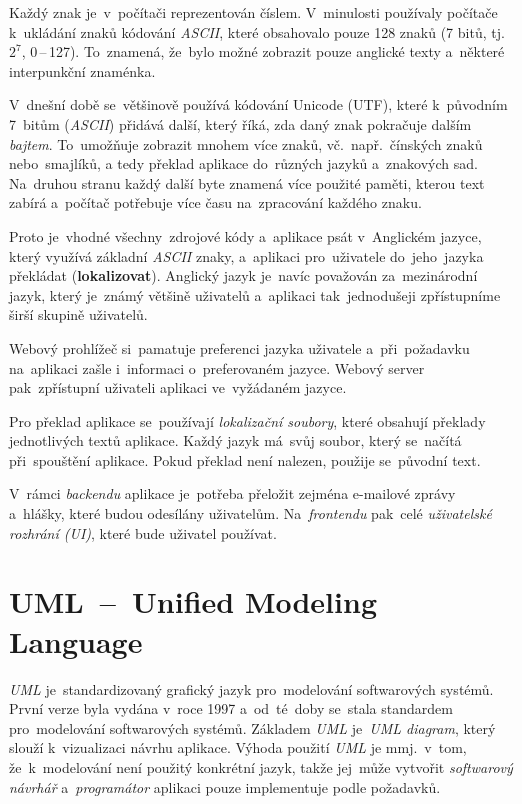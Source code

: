 \documentclass[11pt,a4paper]{report}
\begin{document}
            Každý znak je~v~počítači reprezentován číslem. V~minulosti používaly počítače k~ukládání znaků kódování \emph{ASCII}, které obsahovalo pouze 128 znaků (7 bitů, tj.~$2^7$, 0\,--\,127). To~znamená, že~bylo možné zobrazit pouze anglické texty a~některé interpunkční znaménka. 
            
            V~dnešní době se~většinově používá kódování Unicode (UTF), které k~původním 7~bitům (\emph{ASCII}) přidává další, který říká, zda daný znak pokračuje dalším \emph{bajtem}. To~umožňuje zobrazit mnohem více znaků, vč.~např.~čínských znaků nebo~smajlíků, a tedy překlad aplikace do~různých jazyků a~znakových sad. Na~druhou stranu každý další byte znamená více použité paměti, kterou text zabírá a~počítač potřebuje více času na~zpracování každého znaku.
            
            Proto je~vhodné všechny~zdrojové kódy a~aplikace psát v~Anglickém jazyce, který využívá základní \emph{ASCII} znaky, a~aplikaci pro~uživatele do~jeho~jazyka překládat (\textbf{lokalizovat}). Anglický jazyk je~navíc považován za~mezinárodní jazyk, který je~známý většině uživatelů a~aplikaci tak~jednodušeji zpřístupníme širší skupině uživatelů.
            
            Webový prohlížeč si~pamatuje preferenci jazyka uživatele a~při~požadavku na~aplikaci zašle i~informaci o~preferovaném jazyce. Webový server pak~zpřístupní uživateli aplikaci ve~vyžádaném jazyce.

            Pro překlad aplikace se~používají \emph{lokalizační soubory}, které obsahují překlady jednotlivých textů aplikace. Každý jazyk má~svůj soubor, který se~načítá při~spouštění aplikace. Pokud překlad není nalezen, použije se~původní text.

            V~rámci \emph{backendu} aplikace je~potřeba přeložit zejména e-mailové zprávy a~hlášky, které budou odesílány uživatelům. Na~\emph{frontendu} pak~celé \emph{uživatelské rozhrání (UI)}, které bude uživatel používat.

        \section{UML~--~Unified Modeling Language}
            \emph{UML} je~standardizovaný grafický jazyk pro~modelování softwarových systémů. První verze byla vydána v~roce 1997 a~od~té~doby se~stala standardem pro~modelování softwarových systémů. Základem \emph{UML} je~\emph{UML diagram}, který slouží k~vizualizaci návrhu aplikace. Výhoda použití \emph{UML} je mmj.~v~tom, že~k~modelování není použitý konkrétní jazyk, takže jej~může vytvořit \emph{softwarový návrhář} a~\emph{programátor} aplikaci pouze implementuje podle požadavků.
            
\end{document}
